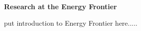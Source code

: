 \begin{center}
\Large\textbf{Research at the Energy Frontier}
\end{center}

put introduction to Energy Frontier here.....
